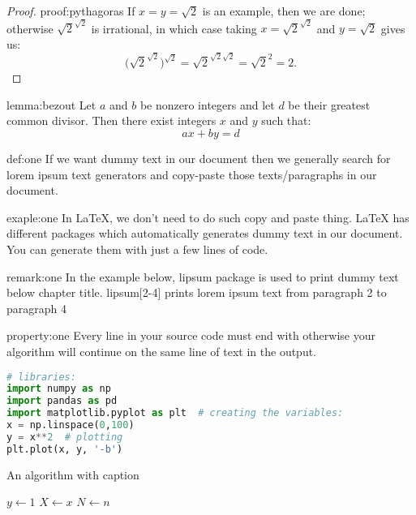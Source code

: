 \documentclass[12pt, french]{report}
\begin{document}
\begin{proof}{proof:pythagoras}
  If $x=y=\sqrt{2}$ is an example, then we are done; otherwise $\sqrt{2}^{\sqrt{2}}$ is irrational, in which case taking $x=\sqrt{2}^{\sqrt{2}}$ and $y=\sqrt{2}$ gives us:
  \[\bigg(\sqrt{2}^{\sqrt{2}}\bigg)^{\sqrt{2}}=\sqrt{2}^{\sqrt{2}\sqrt{2}}=\sqrt{2}^{2}=2.\]
\end{proof}

\newpage

\begin{lemma}{lemma:bezout}
  Let $a$ and $b$ be nonzero integers and let $d$ be their greatest common divisor. Then there exist integers $x$ and $y$ such that:
  \[ax+by=d\]
\end{lemma}

\begin{definition}[]{def:one}
  If we want dummy text in our document then we generally search for lorem ipsum text generators and copy-paste those texts/paragraphs in our document.
\end{definition}

\begin{example}[]{exaple:one}
  In LaTeX, we don't need to do such copy and paste thing. LaTeX has different packages which automatically generates dummy text in our document. You can generate them with just a few lines of code.
\end{example}

\begin{remark}[]{remark:one}
  In the example below, lipsum package is used to print dummy text below chapter title. lipsum[2-4] prints lorem ipsum text from paragraph 2 to paragraph 4
\end{remark}

\begin{property}[]{property:one}
  Every line in your source code must end with otherwise your algorithm will continue on the same line of text in the output.
\end{property}

\begin{lstlisting}[language=Python]
# libraries:
import numpy as np
import pandas as pd
import matplotlib.pyplot as plt  # creating the variables:
x = np.linspace(0,100)
y = x**2  # plotting
plt.plot(x, y, '-b')
\end{lstlisting}

\begin{algorithm}
  \caption{An algorithm with caption}
  $y \gets 1$\;
  $X \gets x$\;
  $N \gets n$\;
\end{algorithm}
\end{document}
